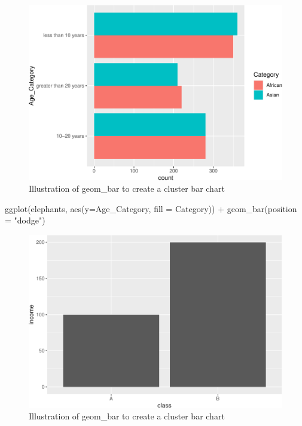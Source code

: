 \documentclass[
]{book}
\newenvironment{Shaded}{\begin{snugshade}}{\end{snugshade}}
\newcommand{\AttributeTok}[1]{\textcolor[rgb]{0.77,0.63,0.00}{#1}}
\newcommand{\FunctionTok}[1]{\textcolor[rgb]{0.00,0.00,0.00}{#1}}
\newcommand{\NormalTok}[1]{#1}
\newcommand{\SpecialCharTok}[1]{\textcolor[rgb]{0.00,0.00,0.00}{#1}}
\newcommand{\StringTok}[1]{\textcolor[rgb]{0.31,0.60,0.02}{#1}}
\begin{document}
\begin{figure}
\centering
\includegraphics{Data-Visualisation-geom-Encyclopedia_files/figure-latex/unnamed-chunk-21-1.pdf}
\caption{\label{fig:unnamed-chunk-21}Illustration of geom\_bar to create a cluster bar chart}
\end{figure}

\begin{Shaded}
\begin{Highlighting}[]
\FunctionTok{ggplot}\NormalTok{(elephants, }\FunctionTok{aes}\NormalTok{(}\AttributeTok{y=}\NormalTok{Age\_Category, }\AttributeTok{fill =}\NormalTok{ Category)) }\SpecialCharTok{+}
  \FunctionTok{geom\_bar}\NormalTok{(}\AttributeTok{position =} \StringTok{"dodge"}\NormalTok{)}
\end{Highlighting}
\end{Shaded}

\begin{figure}
\centering
\includegraphics{Data-Visualisation-geom-Encyclopedia_files/figure-latex/unnamed-chunk-22-1.pdf}
\caption{\label{fig:unnamed-chunk-22}Illustration of geom\_bar to create a cluster bar chart}
\end{figure}
\end{document}
